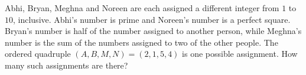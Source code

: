 Abhi, Bryan, Meghna and Noreen are each assigned a different integer from $1$ to $10$, inclusive. Abhi's number is prime and Noreen's number is a perfect square. Bryan's number is half of the number assigned to another person, while Meghna's number is the sum of the numbers assigned to two of the other people. The ordered quadruple $(A,B,M,N)=(2,1,5,4)$ is one possible assignment. How many such assignments are there?
